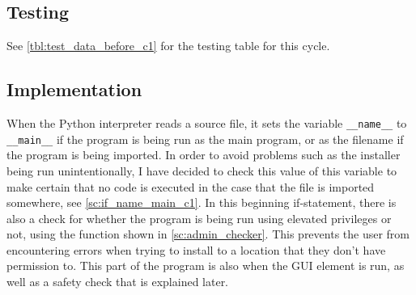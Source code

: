 \documentclass[11pt]{article}
\begin{document}
        \subsection{Testing}

            See \autoref{tbl:test_data_before_c1} for the testing table for this cycle.


        \subsection{Implementation}





            When the Python interpreter reads a source file, it sets the variable \verb|__name__| to \verb|__main__| if the program is being run as the main program, or as the filename if the program is being imported.
            In order to avoid problems such as the installer being run unintentionally, I have decided to check this value of this variable to make certain that no code is executed in the case that the file is imported somewhere, see \autoref{sc:if_name_main_c1}.
            In this beginning if-statement, there is also a check for whether the program is being run using elevated privileges or not, using the function shown in \autoref{sc:admin_checker}. 
            This prevents the user from encountering errors when trying to install to a location that they don't have permission to.
            This part of the program is also when the GUI element is run, as well as a safety check that is explained later.
\end{document}
